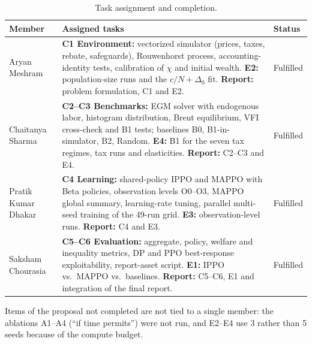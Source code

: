 \documentclass{article}
\begin{document}
\begin{table}[!htbp]
\centering
\caption{Task assignment and completion.}
\label{tab:contrib}
\small
\begin{tabular}{@{}p{2.6cm}p{11.2cm}p{1.5cm}@{}}
\toprule
\textbf{Member} & \textbf{Assigned tasks} & \textbf{Status} \\
\midrule
Aryan Meshram & \textbf{C1 Environment:} vectorized simulator (prices, taxes, rebate, safeguards), Rouwenhorst process, accounting-identity tests, calibration of $\chi$ and initial wealth. \textbf{E2:} population-size runs and the $c/N+\Delta_0$ fit. \textbf{Report:} problem formulation, C1 and E2. & Fulfilled \\
Chaitanya Sharma & \textbf{C2--C3 Benchmarks:} EGM solver with endogenous labor, histogram distribution, Brent equilibrium, VFI cross-check and B1 tests; baselines B0, B1-in-simulator, B2, Random. \textbf{E4:} B1 for the seven tax regimes, tax runs and elasticities. \textbf{Report:} C2--C3 and E4. & Fulfilled \\
Pratik Kumar Dhakar & \textbf{C4 Learning:} shared-policy IPPO and MAPPO with Beta policies, observation levels O0--O3, MAPPO global summary, learning-rate tuning, parallel multi-seed training of the 49-run grid. \textbf{E3:} observation-level runs. \textbf{Report:} C4 and E3. & Fulfilled \\
Saksham Chourasia & \textbf{C5--C6 Evaluation:} aggregate, policy, welfare and inequality metrics, DP and PPO best-response exploitability, report-asset script. \textbf{E1:} IPPO vs.\ MAPPO vs.\ baselines. \textbf{Report:} C5--C6, E1 and integration of the final report. & Fulfilled \\
\bottomrule
\end{tabular}
\end{table}

Items of the proposal not completed are not tied to a single member: the ablations A1--A4 (``if time permits'') were not run, and E2--E4 use 3 rather than 5 seeds because of the compute budget.
\end{document}
